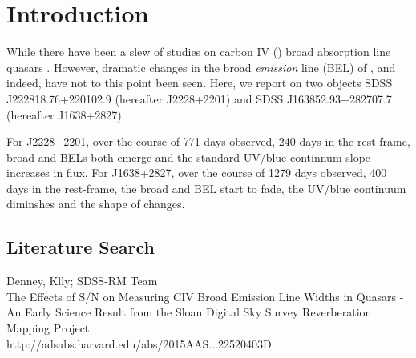 \documentclass[a4paper,fleqn,usenatbib]{mnras}
\begin{document}
\section{Introduction}
While there have been a slew of studies on carbon IV (\civ) broad absorption line quasars
\citep[BAL QSOs; see e.g. Table 1][]{Hemler2019}. However, dramatic changes in the 
broad {\it emission} line (BEL) of \civ, and indeed, \ciii have not to this point been seen. 
Here, we report on two objects SDSS J222818.76+220102.9 (hereafter J2228+2201) and 
SDSS J163852.93+282707.7 (hereafter J1638+2827). 

For J2228+2201, over the course of 771 days observed, 240 days in the rest-frame, broad \civ and \ciii BELs both emerge and the
standard UV/blue continnum slope increases in flux. 
For J1638+2827, over the course of 1279 days observed, 400 days in the rest-frame, the  broad \civ and \ciii BEL start to fade, 
the UV/blue continuum diminshes and the shape of \lya changes. 

\subsection{Literature Search}





Denney, Klly; SDSS-RM Team \\
The Effects of S/N on Measuring CIV Broad Emission Line Widths in Quasars - An Early Science Result from the Sloan Digital Sky Survey Reverberation Mapping Project\\
http://adsabs.harvard.edu/abs/2015AAS...22520403D\\
\end{document}
